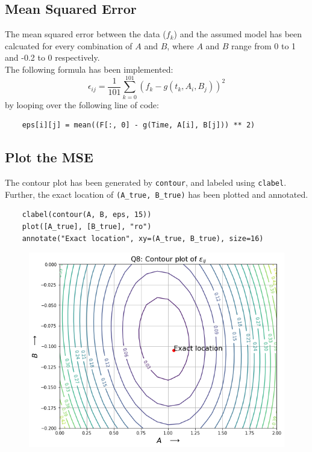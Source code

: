 \documentclass[12pt, a4paper]{article}
\begin{document}
\subsection{Mean Squared Error}
The mean squared error between the data ($f_k$) and the assumed model has been
calcuated for every combination of $A$ and $B$, where $A$ and $B$ range from 0 to 1
and -0.2 to 0 respectively. \\
The following formula has been implemented:
\begin{equation*}
    \epsilon_{ij} = \frac{1}{101} \sum_{k=0}^{101} (f_k - g(t_k, A_i, B_j))^2
\end{equation*}
by looping over the following line of code:
\begin{verbatim}
    eps[i][j] = mean((F[:, 0] - g(Time, A[i], B[j])) ** 2)
\end{verbatim}


\subsection{Plot the MSE}
The contour plot has been generated by \texttt{contour}, and labeled using
\texttt{clabel}. Further, the exact location of \texttt{(A\_true, B\_true)} has been
plotted and annotated.
\begin{verbatim}
    clabel(contour(A, B, eps, 15))
    plot([A_true], [B_true], "ro")
    annotate("Exact location", xy=(A_true, B_true), size=16)
\end{verbatim}
\begin{figure}[H]
    \centering
    \includegraphics[scale=0.6]{Q8.png}
\end{figure}
\end{document}
